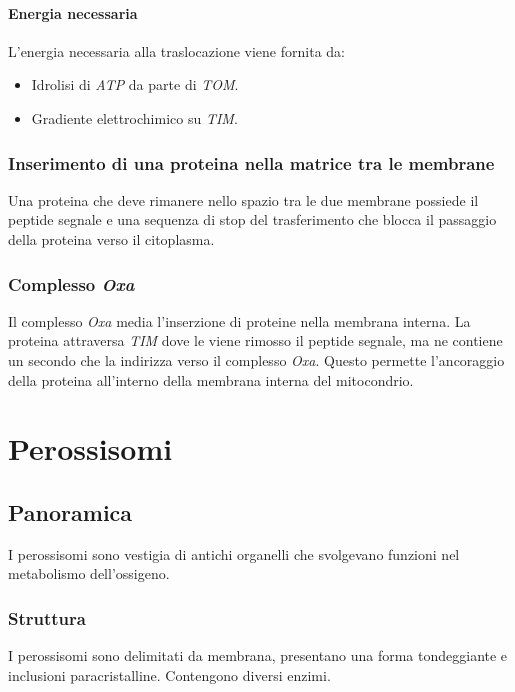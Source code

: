 			\paragraph{Energia necessaria}
			L'energia necessaria alla traslocazione viene fornita da:
			\begin{multicols}{2}
				\begin{itemize}
					\item Idrolisi di \emph{ATP} da parte di \emph{TOM}.
					\item Gradiente elettrochimico su \emph{TIM}.
				\end{itemize}
			\end{multicols}

		\subsubsection{Inserimento di una proteina nella matrice tra le membrane}
		Una proteina che deve rimanere nello spazio tra le due membrane possiede il peptide segnale e una sequenza di stop del trasferimento che blocca il passaggio della proteina verso il citoplasma.

		\subsubsection{Complesso \emph{Oxa}}
		Il complesso \emph{Oxa} media l'inserzione di proteine nella membrana interna.
		La proteina attraversa \emph{TIM} dove le viene rimosso il peptide segnale, ma ne contiene un secondo che la indirizza verso il complesso \emph{Oxa}.
		Questo permette l'ancoraggio della proteina all'interno della membrana interna del mitocondrio.

\section{Perossisomi}

	\subsection{Panoramica}
	I perossisomi sono vestigia di antichi organelli che svolgevano funzioni nel metabolismo dell'ossigeno.

		\subsubsection{Struttura}
		I perossisomi sono delimitati da membrana, presentano una forma tondeggiante e inclusioni paracristalline.
		Contengono diversi enzimi.

